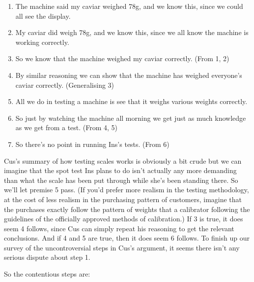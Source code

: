 \begin{enumerate}
\item{} The machine said my caviar weighed 78g, and we know this, since we could all see the display.

\item{} My caviar did weigh 78g, and we know this, since we all know the machine is working correctly.

\item{} So we know that the machine weighed my caviar correctly. (From 1, 2)

\item{} By similar reasoning we can show that the machine has weighed everyone's caviar correctly. (Generalising 3)

\item{} All we do in testing a machine is see that it weighs various weights correctly.

\item{} So just by watching the machine all morning we get just as much knowledge as we get from a test. (From 4, 5)

\item{} So there's no point in running \gls{Ins}'s tests. (From 6)

\end{enumerate}
\gls{Cus}'s summary of how testing scales works is obviously a bit crude but we can imagine that the spot test \gls{Ins} plans to do isn't actually any more demanding than what the scale has been put through while she's been standing there. So we'll let premise 5 pass. (If you'd prefer more realism in the testing methodology, at the cost of less realism in the purchasing pattern of customers, imagine that the purchases exactly follow the pattern of weights that a calibrator following the guidelines of the officially approved methods of calibration.) If 3 is true, it does seem 4 follows, since \gls{Cus} can simply repeat his reasoning to get the relevant conclusions. And if 4 and 5 are true, then it does seem 6 follows. To finish up our survey of the uncontroversial steps in \gls{Cus}'s argument, it seems there isn't any serious dispute about step 1.

So the contentious steps are:

